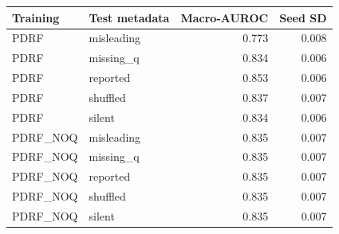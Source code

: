 \begin{tabular}{llrr}
\toprule
Training & Test metadata & Macro-AUROC & Seed SD\\
\midrule
PDRF & misleading & 0.773 & 0.008\\
PDRF & missing\_q & 0.834 & 0.006\\
PDRF & reported & 0.853 & 0.006\\
PDRF & shuffled & 0.837 & 0.007\\
PDRF & silent & 0.834 & 0.006\\
PDRF\_NOQ & misleading & 0.835 & 0.007\\
PDRF\_NOQ & missing\_q & 0.835 & 0.007\\
PDRF\_NOQ & reported & 0.835 & 0.007\\
PDRF\_NOQ & shuffled & 0.835 & 0.007\\
PDRF\_NOQ & silent & 0.835 & 0.007\\
\bottomrule
\end{tabular}
